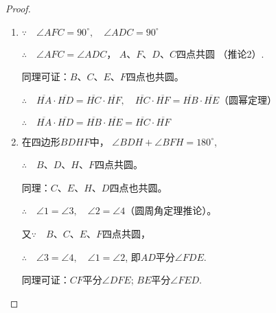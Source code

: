 \begin{figure}[htp]
  \centering
{}
  \caption{}
\end{figure}


\begin{proof}
\begin{enumerate}
  \item $\because\quad \angle AFC=90^{\circ},\quad \angle ADC=90^{\circ}$

$\therefore\quad \angle AFC=\angle ADC$，
$A$、$F$、$D$、$C$四点共圆
（推论2）.

同理可证：$B$、$C$、$E$、$F$四点也共圆。

$\therefore\quad \overline{HA}\cdot \overline{HD}=\overline{HC}\cdot \overline{HF},\quad \overline{HC}\cdot \overline{HF}=\overline{HB}\cdot\overline{HE}$（圆幂定理）

$\therefore\quad \overline{HA}\cdot \overline{HD}=\overline{HB}\cdot\overline{HE}=\overline{HC}\cdot \overline{HF}$

\item 在四边形$BDHF$中，
$\angle BDH+\angle BFH=180^{\circ}$,

$\therefore\quad B$、$D$、$H$、$F$四点共圆。

同理：$C$、$E$、$H$、$D$四点也共圆。

$\therefore\quad \angle 1=\angle 3,\quad \angle 2=\angle 4$（圆周角定理推论）。

又$\because\quad B$、$C$、$E$、$F$四点共圆，

$\therefore\quad \angle 3=\angle 4,\quad \angle 1=\angle 2$, 即$AD$平分$\angle FDE$.

同理可证：$CF$平分$\angle DFE$; $BE$平分$\angle FED$.
\end{enumerate}
\end{proof}


